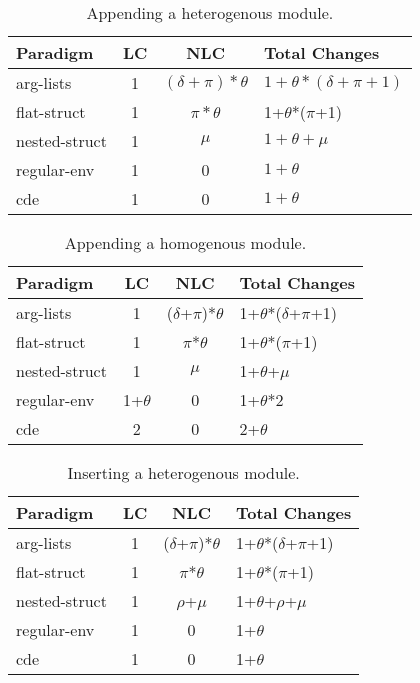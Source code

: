 
\begin{table}
\centering
\begin{tabular*}{0.45\textwidth}{lccl}
\toprule
Paradigm    & LC & NLC & Total Changes\\
\midrule
arg-lists      &  1 & $(\delta+\pi)*\theta$ & $1+\theta*(\delta+\pi+1)$  \\
flat-struct  &  1 & $\pi*\theta$ &  1+$\theta$*($\pi$+1)  \\
nested-struct    &  1 & $\mu$ &  $1+\theta+\mu$  \\
regular-env    &  1 & 0 & $1+\theta$ \\
cde &  1 & 0 & $1+\theta$  \\
\bottomrule
\end{tabular*}
\caption{Appending a heterogenous module.}
\label{het:app}
\end{table}

\begin{table}
\centering
\begin{tabular*}{0.45\textwidth}{lccl}
\toprule
Paradigm    & LC & NLC &Total Changes\\
\midrule
arg-lists      &  1 & ($\delta$+$\pi$)*$\theta$ & 1+$\theta$*($\delta$+$\pi$+1)  \\
flat-struct  &  1 & $\pi$*$\theta$ & 1+$\theta$*($\pi$+1)  \\
nested-struct    &  1 & $\mu$ & 1+$\theta$+$\mu$  \\
regular-env    &  1+$\theta$ & 0 & 1+$\theta$*2 \\
cde &  2 & 0 & 2+$\theta$  \\
\bottomrule
\end{tabular*}
\caption{Appending a homogenous module.}
\label{hom:app}
\end{table}

\begin{table}
\centering
\begin{tabular*}{0.45\textwidth}{lccl}
\toprule
Paradigm    & LC & NLC & Total Changes\\
\midrule
arg-lists      &  1 & ($\delta$+$\pi$)*$\theta$ & 1+$\theta$*($\delta$+$\pi$+1)  \\
flat-struct  &  1 & $\pi$*$\theta$ & 1+$\theta$*($\pi$+1)  \\
nested-struct    &  1 & $\rho$+$\mu$ & 1+$\theta$+$\rho$+$\mu$  \\
regular-env    &  1 & 0&1+$\theta$ \\
cde &  1 & 0 & 1+$\theta$  \\
\bottomrule
\end{tabular*}
\caption{Inserting a heterogenous module.}
\label{het:ins}
\end{table}

